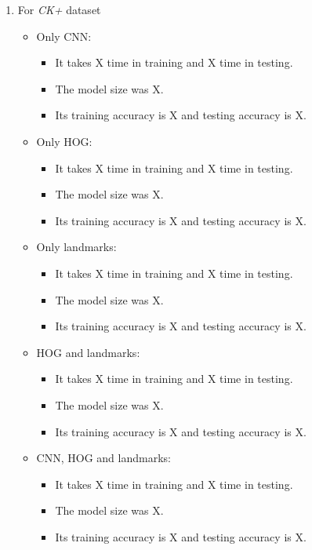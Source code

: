 \documentclass{article}
\begin{document}
\begin{enumerate}
\begin{itemize}
\begin{itemize}
        \end{itemize}
\end{itemize}
\item For \textit{CK+} dataset \newline
\begin{itemize}
    \item Only CNN: 
        \begin{itemize}
            \item It takes X time in training and X time in testing.
            \item The model size was X.
            \item Its training accuracy is X and testing accuracy is X.
        \end{itemize}
    \item Only HOG: 
        \begin{itemize}
            \item It takes X time in training and X time in testing.
            \item The model size was X.
            \item Its training accuracy is X and testing accuracy is X.
        \end{itemize}
    \item Only landmarks: 
        \begin{itemize}
            \item It takes X time in training and X time in testing.
            \item The model size was X.
            \item Its training accuracy is X and testing accuracy is X.
        \end{itemize}
    \item HOG and landmarks: 
        \begin{itemize}
            \item It takes X time in training and X time in testing.
            \item The model size was X.
            \item Its training accuracy is X and testing accuracy is X.
        \end{itemize}
    \item CNN, HOG and landmarks: 
        \begin{itemize}
            \item It takes X time in training and X time in testing.
            \item The model size was X.
            \item Its training accuracy is X and testing accuracy is X.

\end{itemize}
\end{itemize}
\end{enumerate}
\end{document}
